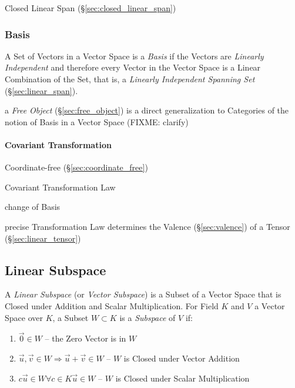 Closed Linear Span (\S\ref{sec:closed_linear_span})



\subsubsection{Basis}\label{sec:basis}

A Set of Vectors in a Vector Space is a \emph{Basis} if the Vectors are
\emph{Linearly Independent} and therefore every Vector in the Vector Space is a
Linear Combination of the Set, that is, a \emph{Linearly Independent Spanning
  Set} (\S\ref{sec:linear_span}).

\fist a \emph{Free Object} (\S\ref{sec:free_object}) is a direct generalization
to Categories of the notion of Basis in a Vector Space
(FIXME: clarify)



\paragraph{Covariant Transformation}\label{sec:covariant_transformation}\hfill

Coordinate-free (\S\ref{sec:coordinate_free})

Covariant Transformation Law

change of Basis

precise Transformation Law determines the Valence
(\S\ref{sec:valence}) of a Tensor (\S\ref{sec:linear_tensor})



\subsection{Linear Subspace}\label{sec:linear_subspace}

A \emph{Linear Subspace} (or \emph{Vector Subspace}) is a Subset of a Vector
Space that is Closed under Addition and Scalar Multiplication. For Field $K$
and $V$ a Vector Space over $K$, a Subset $W \subset K$ is a \emph{Subspace} of
$V$ if:
\begin{enumerate}
  \item $\vec{0} \in W$ -- the Zero Vector is in $W$
  \item $\vec{u}, \vec{v} \in W \Rightarrow \vec{u} + \vec{v} \in W$
    -- $W$ is Closed under Vector Addition
  \item $c\vec{u} \in W \forall c \in K \vec{u} \in W$
    -- $W$ is Closed under Scalar Multiplication
\end{enumerate}

